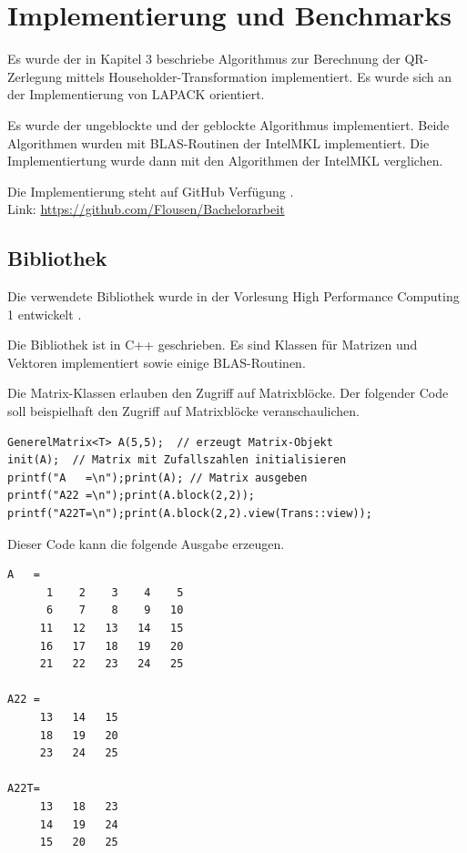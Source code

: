 \chapter{Implementierung und Benchmarks}
Es wurde der in Kapitel 3 beschriebe Algorithmus zur Berechnung der QR-Zerlegung mittels Householder-Transformation implementiert. Es wurde sich an der Implementierung von LAPACK orientiert.

Es wurde der ungeblockte und der geblockte Algorithmus implementiert. Beide Algorithmen wurden mit BLAS-Routinen der IntelMKL implementiert. Die Implementiertung wurde dann mit den Algorithmen der IntelMKL verglichen.

Die Implementierung steht auf GitHub Verfügung \cite{git}.\\
Link: \url{https://github.com/Flousen/Bachelorarbeit}

\section{Bibliothek}
Die verwendete Bibliothek wurde in der Vorlesung High Performance Computing 1 entwickelt \cite{HPC1}.

Die Bibliothek ist in C++ geschrieben. Es sind Klassen für Matrizen und Vektoren implementiert sowie einige BLAS-Routinen.

Die Matrix-Klassen erlauben den Zugriff auf Matrixblöcke. 
Der folgender Code soll beispielhaft den Zugriff auf Matrixblöcke veranschaulichen.

\begin{lstlisting}
GenerelMatrix<T> A(5,5);  // erzeugt Matrix-Objekt
init(A);  // Matrix mit Zufallszahlen initialisieren
printf("A   =\n");print(A); // Matrix ausgeben
printf("A22 =\n");print(A.block(2,2));
printf("A22T=\n");print(A.block(2,2).view(Trans::view));
\end{lstlisting}

Dieser Code kann die folgende Ausgabe erzeugen. \newpage
\lstset{numbers=none}
\begin{lstlisting} 
A   = 
      1    2    3    4    5
      6    7    8    9   10
     11   12   13   14   15
     16   17   18   19   20
     21   22   23   24   25

A22 = 
     13   14   15
     18   19   20
     23   24   25

A22T= 
     13   18   23
     14   19   24
     15   20   25
\end{lstlisting}

